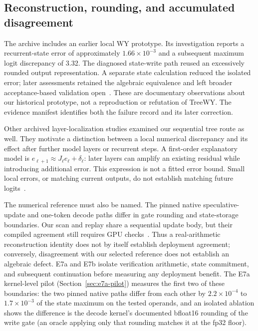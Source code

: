 \documentclass[conference]{IEEEtran}
\begin{document}
\subsection{Reconstruction, rounding, and accumulated disagreement}
\label{sec:reconstruction-numerics}
The archive includes an earlier local WY prototype. Its investigation reports a recurrent-state error of approximately $1.66\times10^{-3}$ and a subsequent maximum logit discrepancy of 3.32. The diagnosed state-write path reused an excessively rounded output representation. A separate state calculation reduced the isolated error; later assessments retained the algebraic equivalence and left broader acceptance-based validation open~\cite{lumo2026archive}. These are documentary observations about our historical prototype, not a reproduction or refutation of TreeWY. The evidence manifest identifies both the failure record and its later correction.

Other archived layer-localization studies examined our sequential tree route as well. They motivate a distinction between a local numerical discrepancy and its effect after further model layers or recurrent steps. A first-order explanatory model is $e_{\ell+1}\approx J_\ell e_\ell+\delta_\ell$: later layers can amplify an existing residual while introducing additional error. This expression is not a fitted error bound. Small local errors, or matching current outputs, do not establish matching future logits~\cite{lumo2026archive}.

The numerical reference must also be named. The pinned native speculative-update and one-token decode paths differ in gate rounding and state-storage boundaries. Our scan and replay share a sequential update body, but their compiled agreement still requires GPU checks~\cite{lumo2026archive}. Thus a real-arithmetic reconstruction identity does not by itself establish deployment agreement; conversely, disagreement with our selected reference does not establish an algebraic defect. E7a and E7b isolate verification arithmetic, state commitment, and subsequent continuation before measuring any deployment benefit. The E7a kernel-level pilot (Section~\ref{sec:e7a-pilot}) measures the first two of these boundaries: the two pinned native paths differ from each other by $2.2\times10^{-4}$ to $1.7\times10^{-3}$ of the state maximum on the tested operands, and an isolated ablation shows the difference is the decode kernel's documented bfloat16 rounding of the write gate (an oracle applying only that rounding matches it at the fp32 floor).
\end{document}
